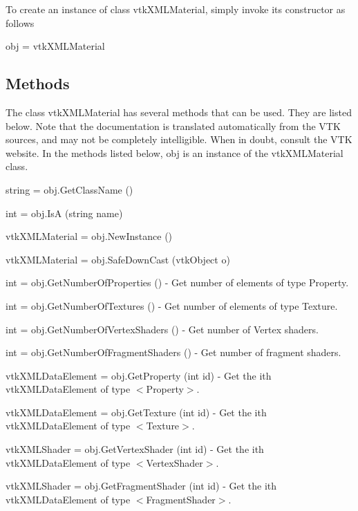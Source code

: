 To create an instance of class vtk\-X\-M\-L\-Material, simply invoke its constructor as follows \begin{DoxyVerb}  obj = vtkXMLMaterial
\end{DoxyVerb}
 \hypertarget{vtkwidgets_vtkxyplotwidget_Methods}{}\subsection{Methods}\label{vtkwidgets_vtkxyplotwidget_Methods}
The class vtk\-X\-M\-L\-Material has several methods that can be used. They are listed below. Note that the documentation is translated automatically from the V\-T\-K sources, and may not be completely intelligible. When in doubt, consult the V\-T\-K website. In the methods listed below, {\ttfamily obj} is an instance of the vtk\-X\-M\-L\-Material class. 
\begin{DoxyItemize}
\item {\ttfamily string = obj.\-Get\-Class\-Name ()}  
\item {\ttfamily int = obj.\-Is\-A (string name)}  
\item {\ttfamily vtk\-X\-M\-L\-Material = obj.\-New\-Instance ()}  
\item {\ttfamily vtk\-X\-M\-L\-Material = obj.\-Safe\-Down\-Cast (vtk\-Object o)}  
\item {\ttfamily int = obj.\-Get\-Number\-Of\-Properties ()} -\/ Get number of elements of type Property.  
\item {\ttfamily int = obj.\-Get\-Number\-Of\-Textures ()} -\/ Get number of elements of type Texture.  
\item {\ttfamily int = obj.\-Get\-Number\-Of\-Vertex\-Shaders ()} -\/ Get number of Vertex shaders.  
\item {\ttfamily int = obj.\-Get\-Number\-Of\-Fragment\-Shaders ()} -\/ Get number of fragment shaders.  
\item {\ttfamily vtk\-X\-M\-L\-Data\-Element = obj.\-Get\-Property (int id)} -\/ Get the ith vtk\-X\-M\-L\-Data\-Element of type $<$\-Property$>$.  
\item {\ttfamily vtk\-X\-M\-L\-Data\-Element = obj.\-Get\-Texture (int id)} -\/ Get the ith vtk\-X\-M\-L\-Data\-Element of type $<$\-Texture$>$.  
\item {\ttfamily vtk\-X\-M\-L\-Shader = obj.\-Get\-Vertex\-Shader (int id)} -\/ Get the ith vtk\-X\-M\-L\-Data\-Element of type $<$\-Vertex\-Shader$>$.  
\item {\ttfamily vtk\-X\-M\-L\-Shader = obj.\-Get\-Fragment\-Shader (int id)} -\/ Get the ith vtk\-X\-M\-L\-Data\-Element of type $<$\-Fragment\-Shader$>$.  

\end{DoxyItemize}

